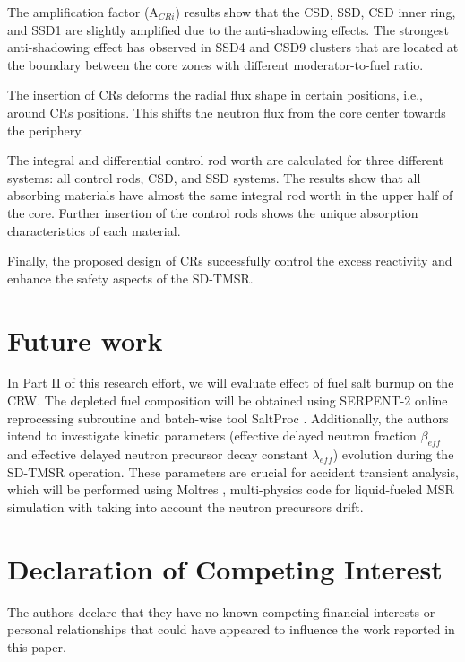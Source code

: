 The amplification factor (A$_{CRi}$) results show that the CSD, SSD, CSD inner ring, and SSD1 are slightly amplified due to the anti-shadowing effects. The strongest anti-shadowing effect has observed in SSD4 and CSD9 clusters that are located at the boundary between the core zones with different moderator-to-fuel ratio.

The insertion of CRs deforms the radial flux shape in certain positions, i.e., around CRs positions. This shifts the neutron flux from the core center towards the periphery.

The integral and differential control rod worth are calculated for three 
different systems: all control rods, CSD, and SSD systems. The results show 
that all absorbing materials have almost the same integral rod worth in the 
upper half of the core. Further insertion of the control rods shows the unique 
absorption characteristics of each material.

Finally, the proposed design of CRs successfully control the excess reactivity and enhance the safety aspects of the SD-TMSR.

\section{Future work}
In Part II of this research effort, we will evaluate effect of fuel salt 
burnup on the CRW. The depleted fuel composition will be obtained using 
SERPENT-2 online reprocessing subroutine \cite{aufiero2013extended} and 
batch-wise tool SaltProc \cite{rykhlevskii_arfc/saltproc_2018, 
rykhlevskii_milestone_2019}. Additionally, the authors intend to investigate 
kinetic parameters (effective delayed neutron fraction $\beta_{eff}$ and 
effective delayed neutron precursor decay constant $\lambda_{eff}$) evolution 
during the SD-TMSR operation. These parameters are crucial for accident 
transient analysis, which will be performed using Moltres 
\cite{lindsay_introduction_2018}, multi-physics code for liquid-fueled MSR 
simulation with taking into account the neutron precursors drift.

\section{Declaration of Competing Interest}

The authors declare that they have no known competing financial interests or personal relationships that could have appeared to influence the work reported in this paper.
